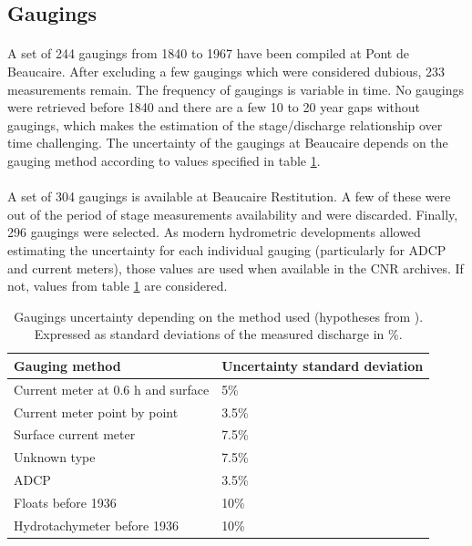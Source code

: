 \documentclass[11pt]{article}
\begin{document}
    \subsection{Gaugings}

    \paragraph{}
    A set of 244 gaugings from 1840 to 1967 have been compiled at Pont de Beaucaire. After excluding a few gaugings which were considered dubious, 233 measurements remain. The frequency of gaugings is variable in time. No gaugings were retrieved before 1840 and there are a few 10 to 20 year gaps without gaugings, which makes the estimation of the stage/discharge relationship over time challenging. The uncertainty of the gaugings at Beaucaire depends on the gauging method according to \citet{bard_actualisation_2018} values specified in table \ref{TabIcJau}.
    
    \paragraph{}    
    A set of 304 gaugings is available at Beaucaire Restitution. A few of these were out of the period of stage measurements availability and were discarded. Finally, 296 gaugings were selected. As modern hydrometric developments allowed estimating the uncertainty for each individual gauging (particularly for ADCP and current meters), those values are used when available in the CNR archives. If not, values from table \ref{TabIcJau} are considered. 
        
         \begin{table}[ht]
            \centering
                \begin{tabular}{| l | l |} 
                        \hline
                        \textbf{Gauging method} & \textbf{Uncertainty standard deviation} \\
                        \hline
                        Current meter at 0.6 h and surface & 5\% \\
                        \hline
                        Current meter point by point & 3.5\% \\
                        \hline
                        Surface current meter & 7.5\% \\
                        \hline
                        Unknown type & 7.5\% \\
                        \hline
                        ADCP & 3.5\% \\
                        \hline
                        Floats before 1936 & 10\% \\
                        \hline
                        Hydrotachymeter before 1936 & 10\%\\
                        \hline
                \end{tabular}
            \caption{Gaugings uncertainty depending on the method used (hypotheses from \citet{bard_actualisation_2018}). Expressed as standard deviations of the measured discharge in \%.}
            \label{TabIcJau}
        \end{table}
 
\end{document}
